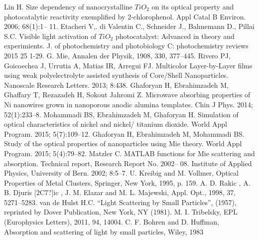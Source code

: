 \documentclass[aip,jap,reprint]{revtex4-1}
\begin{document}
Lin H. Size dependency of nanocrystalline $TiO_2$ on its optical property
and photocatalytic reactivity exemplified by 2-chlorophenol. Appl Catal
B Environ. 2006; 68(1):1-- 11.
Etacheri V,. di Valentin C., Schneider J., Bahnemann D., Pillai S.C.
Visible light activation of $TiO_2$ photocatalyst: Advanced in theory and
experimients. J. of photochemistry and photobiology C: photochemistry
reviews 2015 25  1-29.
G. Mie, Annalen der Physik, 1908, 330, 377--445.
Rivero PJ, Goicoechea J, Urrutia A, Matias IR, Arregui FJ. Multicolor
Layer-by-Layer films using weak polyelectrolyte assisted synthesis of
Core/Shell Nanoparticles. Nanoscale Research Letters. 2013; 8:438.
Ghaforyan H, Ebrahimzadeh M, Ghaffary T, Rezazadeh H, Sokout Jahromi Z.
Microwave absorbing properties of Ni nanowires grown in nanoporous
anodic alumina templates. Chin J Phys. 2014; 52(1):233--8.
Mohammadi BS, Ebrahimzadeh M, Ghaforyan H. Simulation of optical
characteristics of nickel and nickel/ titanium dioxide. World Appl
Program. 2015; 5(7):109--12.
Ghaforyan H, Ebrahimzadeh M, Mohammadi BS. Study of the optical
properties of nanoparticles using Mie theory. World Appl Program. 2015;
5(4):79--82.
Matzler C. MATLAB functions for Mie scattering and absorption. Technical
report, Research Report No. 2002-- 08. Institute of Applied Physics,
University of Bern. 2002; 8:5--7.
U. Kreibig and M. Vollmer, Optical Properties of Metal Clusters,
Springer, New York, 1995, p. 159. 
A. D. Rakic {\textasciiacute}, A. B. Djuris \textlatin{[2C7?]}ic
{\textasciiacute}, J. M. Elazar and M. L. Majewski, Appl. Opt., 1998,
37, 5271--5283.
van de Hulst H.C. {\textquotedblleft}Light Scattering by Small
Particles{\textquotedblright}, (1957), reprinted by Dover Publication,
New York, NY (1981).
M. I. Tribelsky, EPL (Europhysics Letters), 2011, 94, 14004.
C. F. Bohren and D. Huffman, Absorption and scattering of light by small
particles, Wiley, 1983
\end{document}
